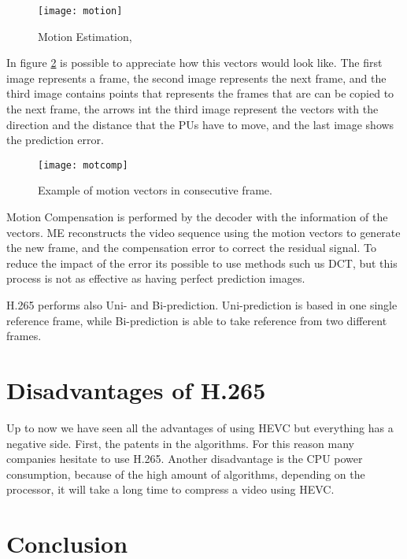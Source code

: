 \documentclass[10pt,journal,compsoc]{IEEEtran}
\begin{document}
\begin{figure}[h]
\texttt{[image: motion]}
\caption{Motion Estimation, \cite{motion}}
\label{fig:motion}
\end{figure}

In figure \ref{fig:sim} \cite{imgcomp} is possible to appreciate how this vectors would look like. The first image represents a frame, the second image represents the next frame, and the third image contains points that represents the frames that are can be copied to the next frame, the arrows int the third image represent the vectors with the direction and the distance that the PUs have to move, and the last image shows the prediction error. \cite{imageproc}



\begin{figure}[h]
\texttt{[image: motcomp]}
\caption{Example of motion vectors in consecutive frame. \cite{imgcomp}}
\label{fig:sim}
\end{figure}

Motion Compensation is performed by the decoder with the information of the vectors. ME reconstructs the video sequence using the motion vectors to generate the new frame, and the compensation error to correct the residual signal. To reduce the impact of the error its possible to use methods such us DCT, but this process is not as effective as having perfect prediction images. \cite{imageproc}

H.265 performs also Uni- and Bi-prediction. Uni-prediction is based in one single reference frame, while Bi-prediction is able to take reference from two different frames. \cite{imageproc}



\section{Disadvantages of H.265}
Up to now we have seen all the advantages of using HEVC but everything has a negative side. First, the patents in the algorithms. For this reason many companies hesitate to use H.265. \cite{disadv} Another disadvantage is the CPU power consumption, because of the high amount of algorithms, depending on the processor, it will take a long time to compress a video using HEVC. \cite{algor}




\section{Conclusion}
\end{document}
